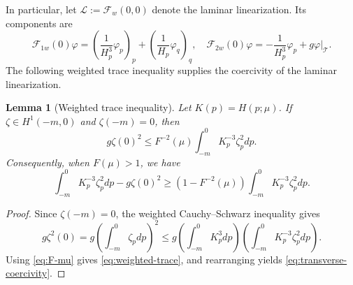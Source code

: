 \documentclass[12pt,letterpaper]{amsart}
\newtheorem{lemma}[theorem]{Lemma}
\numberwithin{equation}{section}
\begin{document}
	
	{In particular, let $\mathcal L:=\mathcal F_w(0,0)$ denote the laminar linearization. Its components are}
	\begin{equation*}
		\mathcal{F}_{1w}(0)\varphi = \left( \frac{1}{H_{p}^3}\varphi_p \right)_p + \left( \frac{1}{H_{p}}\varphi_q \right)_q, \quad \mathcal{F}_{2w}(0)\varphi = -\frac{1}{H_{p}^3}\varphi_p + g\varphi\bigg|_{\mathcal T}.
	\end{equation*}
	{The following weighted trace inequality supplies the coercivity of the laminar linearization.}
	\begin{lemma}[Weighted trace inequality]\label{lem:trace}
		Let $K(p)=H(p;\mu)$. If \(\zeta\in H^1(-m,0)\) and \(\zeta(-m)=0\), then
		\begin{equation}\label{eq:weighted-trace}
			g\zeta(0)^2
			\le F^{-2}(\mu)\int_{-m}^0K_p^{-3}\zeta_p^2d p.
		\end{equation}
		Consequently, when \(F(\mu)>1\), we have
		\begin{equation}\label{eq:transverse-coercivity}
			\int_{-m}^0K_p^{-3}\zeta_p^2d p-g\zeta(0)^2
			\ge(1-F^{-2}(\mu))\int_{-m}^0K_p^{-3}\zeta_p^2d p.
		\end{equation}
	\end{lemma}
	\begin{proof}
		{Since $\zeta(-m)=0$, the weighted Cauchy--Schwarz inequality gives}
		\begin{equation*}
			g\zeta^2(0)=g\left(\int_{-m}^0\zeta_pdp\right)^2\leq g\left(\int_{-m}^0K_p^3d p\right) \left(\int_{-m}^0K_p^{-3}\zeta_p^2d p\right).
		\end{equation*}
		{Using \eqref{eq:F-mu} gives \eqref{eq:weighted-trace}, and rearranging yields \eqref{eq:transverse-coercivity}.}
	\end{proof}
	
	
	
	
	
	
	
	
	
	
	
	
	
	
	
	
	
	
	
	
	
\end{document}
